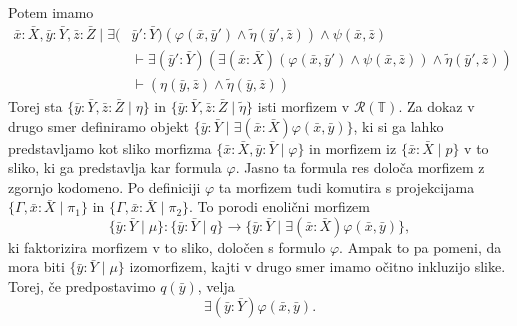\documentclass[../kategoricna_logika.tex]{subfiles}
\begin{document}
\begin{dokaz}
\begin{enumerate}[label=(\roman*)]
    Potem imamo
    \begin{align*}
     \bar{x}:\bar{X},\bar{y}:\bar{Y}, \bar{z}:\bar{Z} \mid \exists (&\bar{y}':\bar{Y})(\varphi(\bar{x},\bar{y}') \land \tilde{\eta}(\bar{y}',\bar{z})) \land \psi(\bar{x},\bar{z}) \\
                                                &\vdash \exists (\bar{y}':\bar{Y}) (\exists (\bar{x}:\bar{X} )(\varphi(\bar{x},\bar{y}') \land \psi(\bar{x},\bar{z})) \land \tilde{\eta}(\bar{y}',\bar{z})) \\
                                                &\vdash (\eta(\bar{y},\bar{z}) \land \tilde{\eta}(\bar{y},\bar{z}))
    \end{align*}
    Torej sta $\{\bar{y}:\bar{Y},\bar{z}:\bar{Z} \mid \eta\}$ in
    $\{\bar{y}:\bar{Y},\bar{z}:\bar{Z} \mid \tilde{\eta}\}$ isti morfizem v
    $\mathcal{R}(\mathbb{T})$. Za dokaz v drugo smer definiramo objekt
    $\{ \bar{y}:\bar{Y} \mid \exists (\bar{x}:\bar{X} ) \varphi(\bar{x},\bar{y})\}$,
    ki si ga lahko predstavljamo
    kot sliko morfizma $\{\bar{x}:\bar{X},\bar{y}:\bar{Y} \mid \varphi \}$
    in morfizem iz $\{\bar{x}:\bar{X} \mid p\}$ v
    to sliko, ki ga predstavlja kar formula $\varphi$. Jasno ta
    formula res določa morfizem z zgornjo kodomeno. Po definiciji
    $\varphi$ ta morfizem tudi komutira s projekcijama $\{\Gamma ,\bar{x}:\bar{X} \mid \pi_1\}$
    in $\{\Gamma ,\bar{x}:\bar{X} \mid \pi_2\}$. To porodi enolični morfizem
    \[\{\bar{y}:\bar{Y} \mid \mu\} : \{\bar{y}:\bar{Y} \mid q\} \to \{ \bar{y}:\bar{Y} \mid \exists (\bar{x}:\bar{X} ) \varphi(\bar{x},\bar{y})\},\]
    ki faktorizira morfizem v to sliko, določen s formulo
    $\varphi$. Ampak to pa pomeni, da mora biti $\{\bar{y}:\bar{Y} \mid \mu\}$ izomorfizem,
    kajti v drugo smer imamo očitno inkluzijo slike. Torej, če
    predpostavimo $q(\bar{y})$, velja
    $$\exists (\bar{y}:\bar{Y}) \varphi(\bar{x},\bar{y}).$$
    


\end{enumerate}
\end{dokaz}
\end{document}
